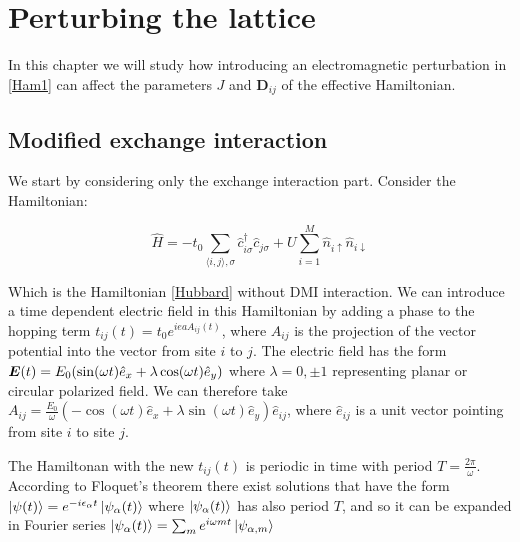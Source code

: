 \chapter{Perturbing the lattice}

In this chapter we will study how introducing an electromagnetic perturbation in \ref{Ham1} can affect the parameters $J$ and $\boldsymbol{D}_{ij}$ of the effective Hamiltonian. 

\section{Modified exchange interaction}

We start by considering only the exchange interaction part. Consider the Hamiltonian:

\begin{equation}
\hat{H} = -t_0\sum_{\langle i,j \rangle, \sigma} \hat{c}_{i \sigma}^\dagger \hat{c}_{j \sigma} + U \sum_{i=1}^M \hat{n}_{i\uparrow}\hat{n}_{i\downarrow}
\end{equation}

Which is the Hamiltonian \ref{Hubbard} without DMI interaction. We can introduce a time dependent electric field in this Hamiltonian by adding a phase to the hopping term $t_{ij}(t) = t_0e^{ieaA_{ij}(t)}$, where $A_{ij}$ is the projection of the vector potential into the vector from site $i$ to $j$. The electric field has the form $\boldsymbol{E}(t) = E_0 (\sin (\omega t) \hat{e}_x + \lambda \cos (\omega t)\hat{e}_y)$ where $\lambda = 0, \pm 1$ representing planar or circular polarized field. We can therefore take $A_{ij} = \frac{E_0}{\omega} (-\cos(\omega t)\hat{e}_x +  \lambda \sin(\omega t)\hat{e}_y)\hat{e}_{ij}$, where $\hat{e}_{ij}$ is a unit vector pointing from site $i$ to site $j$.

The Hamiltonan with the new $t_{ij}(t)$ is periodic in time with period $T=\frac{2\pi}{\omega}$. According to Floquet's theorem there exist solutions that have the form $\ket{\psi(t)} = e^{-i \epsilon_\alpha t} \ket{\psi_\alpha (t)}$ where $\ket{\psi_\alpha(t)}$ has also period $T$, and so it can be expanded in Fourier series $\ket{\psi_\alpha(t)} = \sum_m e^{i\omega mt} \ket{\psi_{\alpha,m}}$
